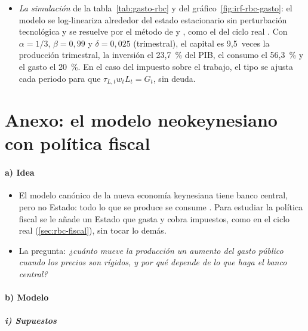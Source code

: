 \documentclass[11pt]{article}
\begin{document}
\begin{itemize}
\item \emph{La simulación} de la tabla~\ref{tab:gasto-rbc} y del gráfico~\ref{fig:irf-rbc-gasto}: el modelo se log-lineariza alrededor del estado estacionario sin perturbación tecnológica y se resuelve por el método de  y , como el del ciclo real . Con $\alpha=1/3$, $\beta=0{,}99$ y $\delta=0{,}025$ (trimestral), el capital es 9,5~veces la producción trimestral, la inversión el 23,7~\% del PIB, el consumo el 56,3~\% y el gasto el 20~\%. En el caso del impuesto sobre el trabajo, el tipo se ajusta cada periodo para que $\tau_{L,t}w_tL_t=G_t$, sin deuda.
\end{itemize}

\section{Anexo: el modelo neokeynesiano con política fiscal}\label{anexo:nek-fiscal}

\paragraph{a) Idea}

\begin{itemize}
\item El modelo canónico de la nueva economía keynesiana tiene banco central, pero no Estado: todo lo que se produce se consume . Para estudiar la política fiscal se le añade un Estado que gasta y cobra impuestos, como en el ciclo real (\ref{sec:rbc-fiscal}), sin tocar lo demás.
\item La pregunta: \emph{¿cuánto mueve la producción un aumento del gasto público cuando los precios son rígidos, y por qué depende de lo que haga el banco central?}\nocite{Woodford2011Simple,Gali2015Monetary}
\end{itemize}

\paragraph{b) Modelo}

\subparagraph{i) Supuestos}
\end{document}
